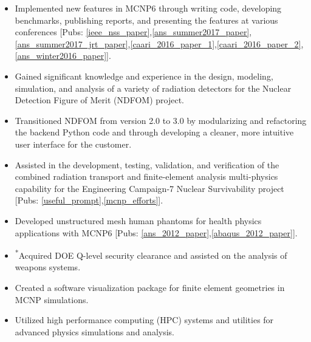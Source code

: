 \begin{minipage}{\textwidth}
	\begin{center}
		\begin{itemize}
	    		\item Implemented new features in \textsc{MCNP6} through writing code, developing benchmarks, publishing reports, and presenting the features at various conferences [Pubs: \ref{ieee_nss_paper},\ref{ans_summer2017_paper},\ref{ans_summer2017_jrt_paper},\ref{caari_2016_paper_1},\ref{caari_2016_paper_2},\ref{ans_winter2016_paper}].
	    		\item Gained significant knowledge and experience in the design, modeling, simulation, and analysis of a variety of radiation detectors for the Nuclear Detection Figure of Merit (NDFOM) project.
	    		\item Transitioned NDFOM from version 2.0 to 3.0 by modularizing and refactoring the backend Python code and through developing a cleaner, more intuitive user interface for the customer.
	    		\item Assisted in the development, testing, validation, and verification of the combined radiation transport and finite-element analysis multi-physics capability for the Engineering Campaign-7 Nuclear Survivability project [Pubs: \ref{useful_prompt},\ref{mcnp_efforts}].
	    		\item Developed unstructured mesh human phantoms for health physics applications with \textsc{MCNP6} [Pubs: \ref{ans_2012_paper},\ref{abaqus_2012_paper}].
	    		\item \textsuperscript{*}Acquired DOE Q-level security clearance and assisted on the analysis of weapons systems.
	    		\item Created a software visualization package for finite element geometries in MCNP simulations.
	    		\item Utilized high performance computing (HPC) systems and utilities for advanced physics simulations and analysis.
		\end{itemize}
	\end{center}
\end{minipage}

